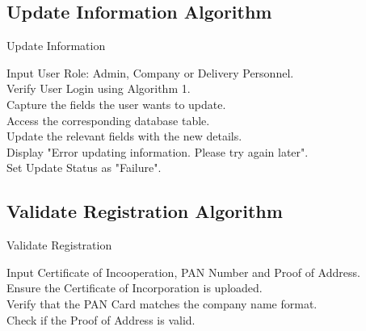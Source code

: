 \subsection{Update Information Algorithm}
\begin{algorithm}[H]
\caption{Update Information}
Input User Role: Admin, Company or Delivery Personnel.
\\
Verify User Login using Algorithm 1.\\
Capture the fields the user wants to update.\\
Access the corresponding database table.\\
Update the relevant fields with the new details.\\
{
Display "Error updating information. Please try again later".\\
Set Update Status as "Failure".\\
}
\end{algorithm}
\subsection{Validate Registration Algorithm}
\begin{algorithm}
\caption{Validate Registration}

Input Certificate of Incooperation, PAN Number and Proof of Address.\\
Ensure the Certificate of Incorporation is uploaded.\\
Verify that the PAN Card matches the company name format.\\
Check if the Proof of Address is valid.\\
\end{algorithm}
